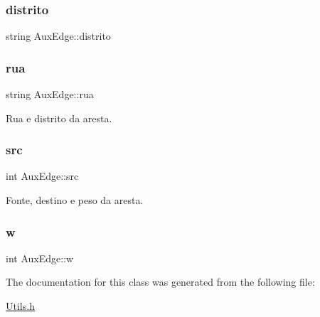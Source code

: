 \subsubsection{\texorpdfstring{distrito}{distrito}}
{\footnotesize\ttfamily string Aux\+Edge\+::distrito}

\mbox{\label{class_aux_edge_a7a52a82fb74a6eddcdab0d4d45917767}} 
\subsubsection{\texorpdfstring{rua}{rua}}
{\footnotesize\ttfamily string Aux\+Edge\+::rua}

Rua e distrito da aresta. \mbox{\label{class_aux_edge_ae60cad09cc21dd040c40d81139dbc2e7}} 
\subsubsection{\texorpdfstring{src}{src}}
{\footnotesize\ttfamily int Aux\+Edge\+::src}

Fonte, destino e peso da aresta. \mbox{\label{class_aux_edge_a688348db28aaaea42d86ea26f33177b2}} 
\subsubsection{\texorpdfstring{w}{w}}
{\footnotesize\ttfamily int Aux\+Edge\+::w}



The documentation for this class was generated from the following file\+:\begin{DoxyCompactItemize}
\item 
\hyperlink{_utils_8h}{Utils.\+h}\end{DoxyCompactItemize}
